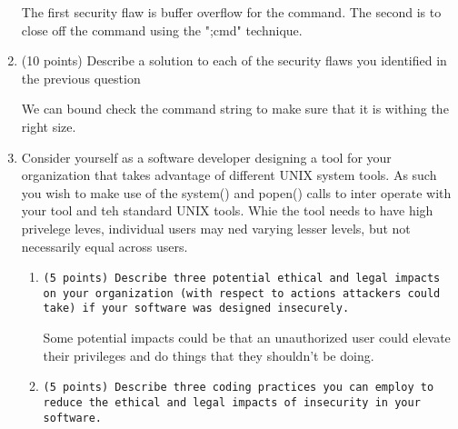 \documentclass{article}[9pt]
\newenvironment{answerfont}{\fontfamily{qhv}\selectfont}{\par}
\newenvironment{myanswer}{\begin{mdframed}\begin{answerfont}}{\end{answerfont}\end{mdframed}}
\begin{document}
\begin{enumerate}
  \begin{myanswer}
  The first security flaw is buffer overflow for the command. The second is to close off the command using the  ";cmd" technique.
  \end{myanswer}

\item (10 points) Describe a solution to each of the security flaws you identified in the previous question

  \begin{myanswer}
  We can bound check the command string to make sure that it is withing the right size.
  \end{myanswer}

\item Consider yourself as a software developer designing a tool for your organization that takes advantage of different UNIX system tools. As such you wish to make use of the
system() and popen() calls to inter operate with your tool and teh standard UNIX tools. Whie the tool needs to have high privelege leves, individual users may ned varying
lesser levels, but not necessarily equal across users.

\begin{enumerate}
\item\texttt{(5 points) Describe three potential ethical and legal impacts on your organization (with respect to actions attackers could take) if your software was designed insecurely.}
  \begin{myanswer}
  Some potential impacts could be that an unauthorized user could elevate their privileges and do things that they shouldn't be doing.
  \end{myanswer}

\item\texttt{(5 points) Describe three coding practices you can employ to reduce the ethical and legal impacts of insecurity in your software.}
  \begin{myanswer}
  \end{myanswer}

\end{enumerate}

\end{enumerate}
\end{document}
